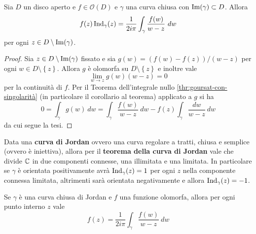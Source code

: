 \begin{theorem}
    Sia $D$ un disco aperto e $f \in \mathcal{O}(D)$ e $\gamma$ una curva
    chiusa con $\operatorname{Im}(\gamma) \subset D$. Allora
    \begin{equation*}
        f(z) \operatorname{Ind}_\gamma(z) = \frac{1}{2i\pi} \int_\gamma
        \frac{f(w)}{w-z} \ dw
    \end{equation*}
    per ogni $z \in D \setminus \operatorname{Im}(\gamma)$.
    \label{thr:formula-integrale-cauchy}
\end{theorem}
\begin{proof}
  Sia $z \in D \setminus \operatorname{Im}(\gamma)$ fissato e sia $g(w) = (f(w) - f(z))
  / (w-z)$ per ogni $w \in D \setminus \left\{ z \right\}$. 
  Allora $g$ è olomorfa su $D \setminus \left\{ z \right\}$ e inoltre vale
  \begin{equation*}
    \lim_{w \to z} g(w) (w-z) = 0
  \end{equation*}
  per la continuità di $f$. Per il Teorema dell'integrale nullo
  \ref{thr:goursat-con-singolarità} (in particolare il corollario 
  al teorema) applicato a $g$ si ha
  \begin{equation*}
    0  = \int_\gamma g(w)\ dw = \int_\gamma \frac{f(w)}{w-z}\ dw
    - f(z)\int_\gamma \frac{dw}{w-z}\ dw 
  \end{equation*}
  da cui segue la tesi.
\end{proof} 

\begin{remark}
  Data una \textbf{curva di Jordan} ovvero una curva regolare a tratti,
  chiusa e semplice (ovvero è iniettiva), allora per il \textbf{teorema
  della curva di Jordan} vale che divide $\mathbb{C}$ in due componenti connesse, 
  una illimitata e una limitata. In particolare se $\gamma$ è orientata 
  positivamente avrà $\operatorname{Ind}_\gamma(z) = 1$ per ogni $z$ nella
  componente connessa limitata, altrimenti sarà orientata negativamente
  e allora $\operatorname{Ind}_\gamma(z) = -1$.
  \label{rmk:teorema-curva-di-jordan}
\end{remark}

\begin{corollary}
    Se $\gamma$ è una curva chiusa di Jordan e $f$ una funzione olomorfa, allora
    per ogni punto interno $z$ vale 
    \begin{equation*}
        f(z) = \frac{1}{2i\pi} \int_\gamma\frac{f(w)}{w-z}\ dw
    \end{equation*}
    \label{cor:curva-jordan-integral-calculation}
\end{corollary}


